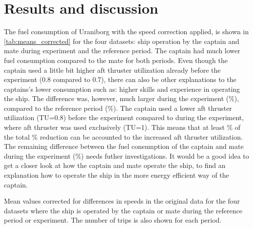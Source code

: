 \section{Results and discussion}
The fuel consumption of Uraniborg with the speed correction applied, is shown in \autoref{tab:means_corrected} for the four datasets: ship operation by the captain and mate during experiment and the reference period. The captain had much lower fuel consumption compared to the mate for both periods. Even though the captain used a little bit higher aft thruster utilization already before the experiment (0.8 compared to 0.7), there can also be other explanations to the captains's lower consumption such as: higher skills and experience in operating the ship.
The difference was, however, much larger during the experiment (\savingpctexperiment \%), compared to the reference period (\savingpctbeforeexperiment \%). The captain used a lower aft thruster utilization (TU=0.8) before the experiment compared to during the experiment, where aft thruster was used exclusively (TU=1). This means that at least \savingthrusterallocationpct \% of the total \savingpctexperiment \% reduction can be accounted to the increased aft thruster utilization.
The remaining difference between the fuel consumption of the captain and mate during the experiment (\savingpctbeforeexperiment \%) needs futher investigations. It would be a good idea to get a closer look at how the captain and mate operate the ship, to find an explanation how to operate the ship in the more energy efficient way of the captain.

\begin{table}[h]
    \centering
    \caption{Mean values corrected for differences in speeds in the original data for the four datasets where the ship is operated by the captain or mate during the reference period or experiment. The number of trips is also shown for each period.}
    \label{tab:means_corrected}
\end{table}

